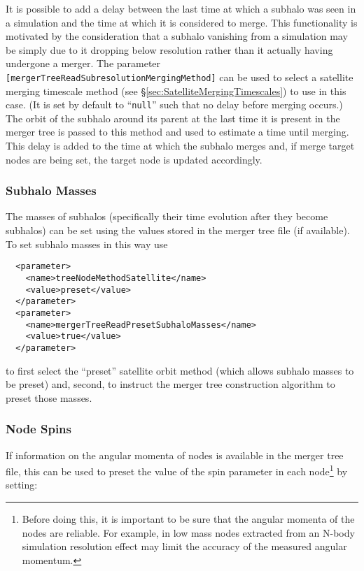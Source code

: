It is possible to add a delay between the last time at which a subhalo was seen in a simulation and the time at which it is considered to merge. This functionality is motivated by the consideration that a subhalo vanishing from a simulation may be simply due to it dropping below resolution rather than it actually having undergone a merger. The parameter {\tt [mergerTreeReadSubresolutionMergingMethod]} can be used to select a satellite merging timescale method (see \S\ref{sec:SatelliteMergingTimescales}) to use in this case. (It is set by default to ``{\tt null}'' such that no delay before merging occurs.) The orbit of the subhalo around its parent at the last time it is present in the merger tree is passed to this method and used to estimate a time until merging. This delay is added to the time at which the subhalo merges and, if merge target nodes are being set, the target node is updated accordingly.

\subsubsection{Subhalo Masses}

The masses of subhalos (specifically their time evolution after they become subhalos) can be set using the values stored in the merger tree file (if available). To set subhalo masses in this way use
\begin{verbatim}
  <parameter>
    <name>treeNodeMethodSatellite</name>
    <value>preset</value>    
  </parameter>
  <parameter>
    <name>mergerTreeReadPresetSubhaloMasses</name>
    <value>true</value>
  </parameter>
\end{verbatim}
to first select the ``preset'' satellite orbit method (which allows subhalo masses to be preset) and, second, to instruct the merger tree construction algorithm to preset those masses.

\subsubsection{Node Spins}

If information on the angular momenta of nodes is available in the merger tree file, this can be used to preset the value of the spin parameter in each node\footnote{Before doing this, it is important to be sure that the angular momenta of the nodes are reliable. For example, in low mass nodes extracted from an N-body simulation resolution effect may limit the accuracy of the measured angular momentum.} by setting:

